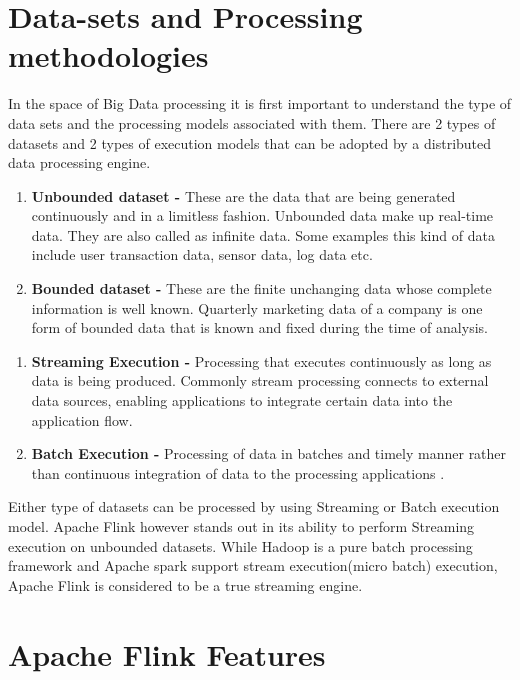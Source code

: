 \section{Data-sets and Processing methodologies}

In the space of Big Data processing it is first important to understand the type of data sets and the processing models associated with them. There are 2 types of datasets and 2 types of execution models that can be adopted by a distributed data processing engine. 

\begin{enumerate}
\item \textbf{Unbounded dataset - } These are the data that are being generated continuously and in a limitless fashion. Unbounded data make up real-time data. They are also called as infinite data. Some examples this kind of data include user transaction data, sensor data, log data etc.
\item \textbf{Bounded dataset - } These are the finite unchanging data whose complete information is well known. Quarterly marketing data of a company is one form of bounded data that is known and fixed during the time of analysis.
\end{enumerate}


\begin{enumerate}\item \textbf{Streaming Execution - } Processing that executes continuously as long as data is being produced. Commonly stream processing connects to external data sources, enabling applications to integrate certain data into the application flow.
\item \textbf{Batch Execution - } Processing of data in batches and timely manner rather than continuous integration of data to the processing applications \cite{Apache-Flink}. 
\end{enumerate}

Either type of datasets can be processed by using Streaming or Batch execution model. Apache Flink however stands out in its ability to perform Streaming execution on unbounded datasets. While Hadoop is a pure batch processing framework and Apache spark support stream execution(micro batch)  execution, Apache Flink is considered to be a true streaming engine.

\section{Apache Flink Features} 

